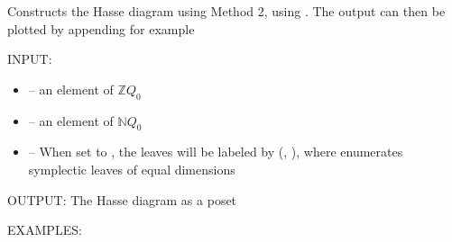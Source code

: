 \documentclass[letterpaper,10pt,english]{sphinxmanual}
\begin{document}
\begin{fulllineitems}
\label{\detokenize{index:quivercombinatorics.quivercombinatorics.Quiver.plot_Hasse_diagram_method_2}}
\pysigstartsignatures
\pysiglinewithargsret
{}
{\sphinxparamcomma {}}
{}
\pysigstopsignatures
\sphinxAtStartPar
Constructs the Hasse diagram using Method 2, using . The output can then be plotted by appending  for example

\sphinxAtStartPar
INPUT:
\begin{itemize}
\item {} 
\sphinxAtStartPar
{} – an element of \(\mathbb{Z}Q_0\)

\item {} 
\sphinxAtStartPar
{} – an element of \(\mathbb{N}Q_0\)

\item {} 
\sphinxAtStartPar
{} – When set to , the leaves will be labeled by (, ), where  enumerates symplectic leaves of equal dimensions

\end{itemize}

\sphinxAtStartPar
OUTPUT: The Hasse diagram as a poset

\sphinxAtStartPar
EXAMPLES:

\begin{sphinxVerbatim}[commandchars=\\\{\}]
  
   \PYG{p}{[}\PYG{p}{[}  \PYG{p}{]} \PYG{p}{[}  \PYG{p}{]} \PYG{p}{[}  \PYG{p}{]}\PYG{p}{]}
   
      
    


\end{sphinxVerbatim}
\end{fulllineitems}
\end{document}
